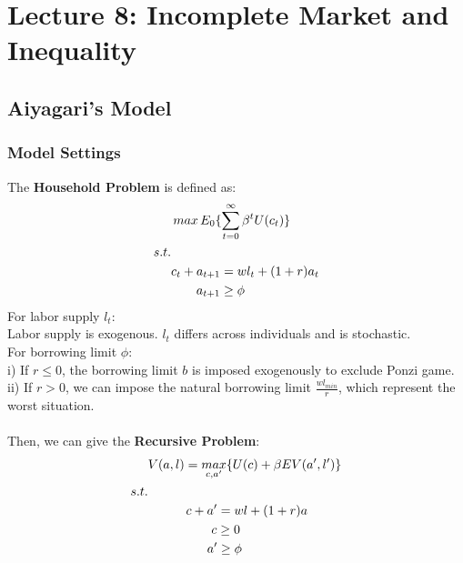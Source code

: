 \documentclass{article}
\begin{document}
\newpage
\section{Lecture 8: Incomplete Market and Inequality}
\subsection{Aiyagari's Model}
\subsubsection{Model Settings}
The \textbf{Household Problem} is defined as:
	\begin{align*}
		&\mathop{max} E_0 \{\sum\limits^\infty_{t=0} \beta^t U(c_t)\}\\
		s.t.&\\
		&c_t + a_{t+1} = w l_t + (1 + r) a_t\\
		&\indent\ \,  a_{t+1} \geq \phi 
	\end{align*}
For labor supply $l_t$:\\
\indent Labor supply is exogenous. $l_t$ differs across individuals and is stochastic.\\
For borrowing limit $\phi$:\\
\indent i) If $r \leq 0$, the borrowing limit $b$ is imposed exogenously to exclude Ponzi game.\\
\indent ii) If $r > 0$, we can impose the natural borrowing limit $\frac{wl_{min}}{r}$, which represent the worst situation.\\\\
Then, we can give the \textbf{Recursive Problem}:
	\begin{align*}
		&V(a, l) = \mathop{max}\limits_{c, a^\prime} \{U(c) + \beta EV(a^\prime, l^\prime)\}\\
		s.t.&\\
		&\indent\indent c + a^\prime = wl + (1 + r)a\\
		&\indent\indent\indent\ \, c \geq 0\\
		&\indent\indent\indent\, a^\prime \geq \phi
	\end{align*}
\end{document}
